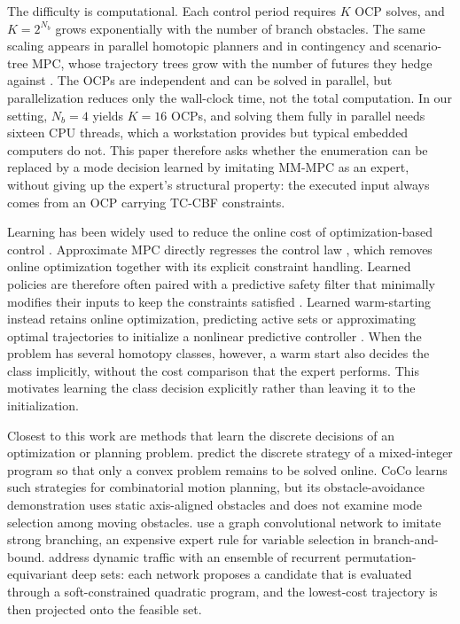\documentclass{article}
\theoremstyle{definition}
\begin{document}
The difficulty is computational. Each control period requires $K$ OCP solves, and $K=2^{N_b}$ grows exponentially with the number of branch obstacles. The same scaling appears in parallel homotopic planners \citep{zheng2025barrier} and in contingency and scenario-tree MPC, whose trajectory trees grow with the number of futures they hedge against \citep{alsterda2019contingency,chen2022interactive}. The OCPs are independent and can be solved in parallel, but parallelization reduces only the wall-clock time, not the total computation. In our setting, $N_b=4$ yields $K=16$ OCPs, and solving them fully in parallel needs sixteen CPU threads, which a workstation provides but typical embedded computers do not. This paper therefore asks whether the enumeration can be replaced by a mode decision learned by imitating MM-MPC as an expert, without giving up the expert's structural property: the executed input always comes from an OCP carrying TC-CBF constraints.

Learning has been widely used to reduce the online cost of optimization-based control \citep{hewing2020learning}. Approximate MPC directly regresses the control law \citep{hertneck2018learning,karg2020efficient,liu2026approximate}, which removes online optimization together with its explicit constraint handling. Learned policies are therefore often paired with a predictive safety filter that minimally modifies their inputs to keep the constraints satisfied \citep{wabersich2021predictive}. Learned warm-starting instead retains online optimization, predicting active sets \citep{klauco2019machine} or approximating optimal trajectories to initialize a nonlinear predictive controller \citep{mansard2018using}. When the problem has several homotopy classes, however, a warm start also decides the class implicitly, without the cost comparison that the expert performs. This motivates learning the class decision explicitly rather than leaving it to the initialization.

Closest to this work are methods that learn the discrete decisions of an optimization or planning problem. \citet{bertsimas2022online} predict the discrete strategy of a mixed-integer program so that only a convex problem remains to be solved online. CoCo \citep{cauligi2022coco} learns such strategies for combinatorial motion planning, but its obstacle-avoidance demonstration uses static axis-aligned obstacles and does not examine mode selection among moving obstacles. \citet{gasse2019exact} use a graph convolutional network to imitate strong branching, an expensive expert rule for variable selection in branch-and-bound. \citet{reiter2025equivariant} address dynamic traffic with an ensemble of recurrent permutation-equivariant deep sets: each network proposes a candidate that is evaluated through a soft-constrained quadratic program, and the lowest-cost trajectory is then projected onto the feasible set.
\end{document}
